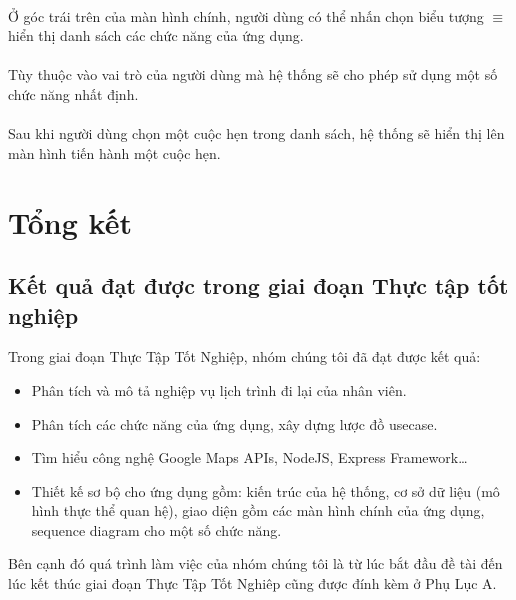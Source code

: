 \documentclass[a4paper]{article}
\begin{document}
\\
Ở góc trái trên của màn hình chính, người dùng có thể nhấn chọn biểu tượng $\equiv$ hiển thị danh sách các chức năng của ứng dụng.\\\\
Tùy thuộc vào vai trò của người dùng mà hệ thống sẽ cho phép sử dụng một số chức năng nhất định.\\
\\
Sau khi người dùng chọn một cuộc hẹn trong danh sách, hệ thống sẽ hiển thị lên màn hình tiến hành một cuộc hẹn.\\
\section{Tổng kết}
\subsection*{Kết quả đạt được trong giai đoạn Thực tập tốt nghiệp}
Trong giai đoạn Thực Tập Tốt Nghiệp, nhóm chúng tôi đã đạt được kết quả:
\begin{itemize}
\item Phân tích và mô tả nghiệp vụ lịch trình đi lại của nhân viên.
\item Phân tích các chức năng của ứng dụng, xây dựng lược đồ usecase.
\item Tìm hiểu công nghệ Google Maps APIs, NodeJS, Express Framework…
\item Thiết kế sơ bộ cho ứng dụng gồm: kiến trúc của hệ thống, cơ sở dữ liệu (mô hình thực thể quan hệ), giao diện gồm các màn hình chính của ứng dụng, sequence diagram cho một số chức năng.
\end{itemize}
Bên cạnh đó quá trình làm việc của nhóm chúng tôi là từ lúc bắt đầu đề tài đến lúc kết thúc giai đoạn Thực Tập Tốt Nghiêp cũng được đính kèm ở Phụ Lục A.	
\end{document}
